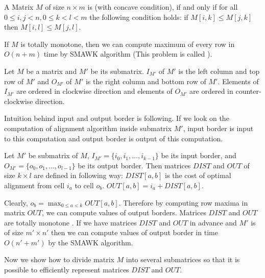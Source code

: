 \begin{definition}\cite{Crochemore2002}
A Matrix $M$ of size $n\times m$ is  (with concave condition),
if and only if for all $0\leq i,j< n, 0\leq k<l<m$ the following condition holds:
if $M[i,k]\leq M[j,k]$ then $M[i,l]\leq M[j,l]$.
\end{definition}

If $M$ is totally monotone, then we can compute maximum of every row 
in $O(n+m)$ time by SMAWK algorithm \cite{Aggarwal1987} (This problem is called
).

\begin{definition}\cite{Crochemore2002}
Let $M$ be a matrix and $M'$ be its
submatrix.  $I_{M'}$ of $M'$ is the left column and top
row of $M'$ and  $O_{M'}$ of $M'$ is the right column and
bottom row of $M'$. Elements of $I_{M'}$ are ordered in clockwise direction
and elements of $O_{M'}$ are ordered in counter-clockwise direction.
\end{definition}

Intuition behind input and output border is following. If we look on the
computation of alignment algorithm inside submatrix $M'$, input border is input
to this computation and output border is output of this computation.

\begin{definition}\cite{Crochemore2002}
Let $M'$ be submatrix of $M$, $I_{M'}=\{i_0,i_1,\dots,i_{k-1}\}$ be its input
border, and $O_{M'}=\{o_0,o_1,\dots,o_{l-1}\}$ be its output border. Then
matrices
$DIST$ and $OUT$ of size $k\times l$ are defined in following way:
$DIST[a,b]$ is the cost of optimal alignment from cell $i_a$ to cell $o_b$.
$OUT[a,b]=i_a+DIST[a,b]$.
\end{definition}

Clearly, $o_b=\max_{0\leq a < k}OUT[a,b]$. Therefore by computing row maxima in
matrix $OUT$, we can compute values of output borders. Matrices $DIST$ and $OUT$
are totally monotone \cite{Crochemore2002}.  If we have matrices $DIST$ and
$OUT$ in advance and $M'$ is of size $m'\times n'$ then we can compute values of
output border in time $O(n'+m')$ by the SMAWK algorithm.

Now we show how to divide matrix $M$ into several submatrices so that
it is possible to efficiently represent matrices $DIST$ and $OUT$.



